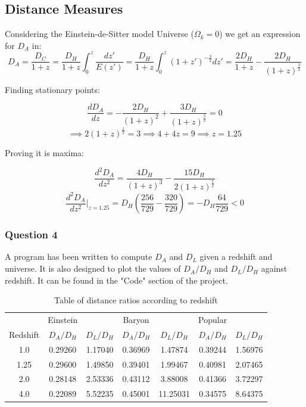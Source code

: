 \documentclass{article}
\begin{document}
\clearpage

\subsection{Distance Measures}

Considering the Einstein-de-Sitter model Universe ($\Omega_k = 0$) we get an expression for $D_A$ in:
$$D_A = \frac{D_C}{1+z} = \frac{D_H}{1+z} \int_0^z \frac{dz'}{E(z')} = \frac{D_H}{1+z}\int_0^z (1+z')^{-\frac{3}{2}}dz' = \frac{2D_H}{1+z} - \frac{2D_H}{(1+z)^{\frac{3}{2}}}$$

Finding stationary points:

$$\frac{d D_A}{dz} = - \frac{2D_H}{(1+z)^2} + \frac{3D_H}{(1+z)^{\frac{5}{2}}} = 0$$
$$\implies 2(1+z)^{\frac{1}{2}} = 3 \implies 4 + 4z = 9 \implies z = 1.25$$

Proving it is maxima:

$$\frac{d^2 D_A}{dz^2} = \frac{4D_H}{(1+z)^3} - \frac{15D_H}{2(1+z)^{\frac{7}{2}}}$$
$$\frac{d^2 D_A}{dz^2}|_{z=1.25} = D_H ( \frac{256}{729} - \frac{320}{729}) = -D_H \frac{64}{729} < 0$$

\subsubsection{Question 4}
A program has been written to compute $D_A$ and $D_L$ given a redshift and universe. It is also designed to plot the values of $D_A/D_H$ and $D_L/D_H$ against redshift. It can be found in the "Code" section of the project.

\begin{table}[!h]
	\centering
	\begin{tabular}{ |c|cc|cc|cc| }
		\hline
		         & Einstein  &           & Baryon    &           & Popular   &           \\
		Redshift & $D_A/D_H$ & $D_L/D_H$ & $D_A/D_H$ & $D_L/D_H$ & $D_A/D_H$ & $D_L/D_H$ \\ \hline \hline
		1.0      & 0.29260   & 1.17040   & 0.36969   & 1.47874   & 0.39244   & 1.56976   \\ \hline
		1.25     & 0.29600   & 1.49850   & 0.39401   & 1.99467   & 0.40981   & 2.07465   \\ \hline
		2.0      & 0.28148   & 2.53336   & 0.43112   & 3.88008   & 0.41366   & 3.72297   \\ \hline
		4.0      & 0.22089   & 5.52235   & 0.45001   & 11.25031  & 0.34575   & 8.64375   \\ \hline
	\end{tabular}
	\caption{Table of distance ratios according to redshift}
\end{table}
\end{document}
